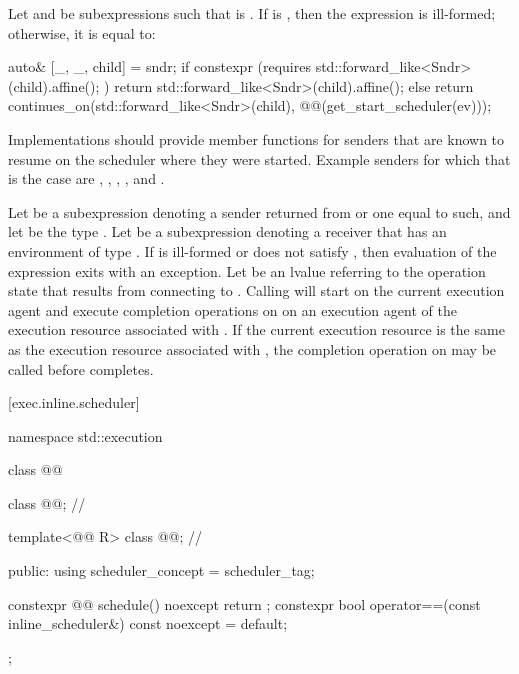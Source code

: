 \pnum
Let  and  be subexpressions
such that  is .
If  is ,
then the expression  is ill-formed;
otherwise, it is equal to:
\begin{codeblock}
auto& [_, _, child] = sndr;
if constexpr (requires { std::forward_like<Sndr>(child).affine(); }) {
  return std::forward_like<Sndr>(child).affine();
} else {
  return continues_on(std::forward_like<Sndr>(child),
                      @@(get_start_scheduler(ev)));
}
\end{codeblock}

\pnum
\recommended
Implementations should provide  member functions
for senders that are known to resume on the scheduler where they were started.
Example senders for which that is the case are
,
,
,
, and
.

\pnum
Let  be a subexpression denoting a sender
returned from  or one equal to such,
and let  be the type .
Let  be a subexpression denoting a receiver that
has an environment of type .
If  is ill-formed or
does not satisfy ,
then evaluation of
the expression 
exits with an exception.
Let  be an lvalue referring to the operation state that
results from connecting  to .
Calling  will start  on the current
execution agent and execute completion operations on 
on an execution agent of the execution resource associated with
.
If the current execution resource is the same as the execution
resource associated with , the completion operation on
 may be called before  completes.

[exec.inline.scheduler]{}

\begin{codeblock}
namespace std::execution {
  class @@ {
    class @@;                // \expos

    template<@@ R>
      class @@;               // \expos

  public:
    using scheduler_concept = scheduler_tag;

    constexpr @@ schedule() noexcept { return {}; }
    constexpr bool operator==(const inline_scheduler&) const noexcept = default;
  };
}
\end{codeblock}


